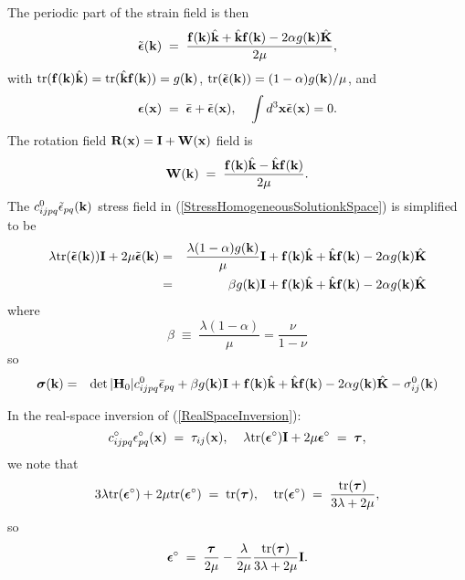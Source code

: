 \documentclass[12pt]{article}
\def\bmath#1{\mbox{\boldmath$#1$}}
\begin{document}
The periodic part of the strain field is then
\begin{equation}
 \tilde{\bmath{\epsilon}}({\bf k}) \;=\; 
\frac{{\bf f}({\bf k})\hat{\bf k}+\hat{\bf k}{\bf f}({\bf k}) - 2\alpha g({\bf k})\hat{\bf K}}
 {2\mu},
\end{equation}
with ${\rm tr}({\bf f}({\bf k})\hat{\bf k})={\rm tr}(\hat{\bf k}{\bf
f}({\bf k}))=g({\bf k})$, ${\rm tr}(\tilde{\bmath{\epsilon}}({\bf k}))=(1-\alpha)g({\bf k})/\mu$, and
\begin{equation}
 \bmath{\epsilon}({\bf x}) \;=\; \bar{\bmath{\epsilon}} + 
 \tilde{\bmath{\epsilon}}({\bf x}), \;\;\;\;
 \int d^3{\bf x} \tilde{\bmath{\epsilon}}({\bf x}) = 0.
\end{equation}
The rotation field ${\bf R}({\bf x})={\bf I}+{\bf W}({\bf x})$ 
 field is
\begin{equation}
 {\bf W}({\bf k}) \;=\; 
\frac{{\bf f}({\bf k})\hat{\bf k}-\hat{\bf k}{\bf f}({\bf k})}
 {2\mu}.
\end{equation}
The $c_{ijpq}^0\tilde{\epsilon}_{pq}({\bf k})$
stress field in (\ref{StressHomogeneousSolutionkSpace}) is simplified to be
\begin{eqnarray}
 \lambda {\rm tr}(\tilde{\bmath{\epsilon}}({\bf k})){\bf I} + 2\mu \tilde{\bmath{\epsilon}}({\bf k})  =&&  
\frac{\lambda(1-\alpha)g({\bf k})}{\mu}{\bf I} + 
 {\bf f}({\bf k})\hat{\bf k}+\hat{\bf k}{\bf f}({\bf k}) - 2\alpha g({\bf k})\hat{\bf K} \nonumber\\
 =&& \beta g({\bf k}){\bf I} + {\bf f}({\bf k})\hat{\bf k}+\hat{\bf k}{\bf f}({\bf k}) - 2\alpha g({\bf k})\hat{\bf K}
\end{eqnarray}
where
\begin{equation}
 \beta \;\equiv\; \frac{\lambda(1-\alpha)}{\mu} = \frac{\nu}{1-\nu}
\end{equation}
so
\begin{eqnarray}
 \bmath{\sigma}({\bf k}) =&& \det|{\bf H}_0|c_{ijpq}^0\bar{\epsilon}_{pq} +
\beta g({\bf k}){\bf I} + {\bf f}({\bf k})\hat{\bf k}+\hat{\bf k}{\bf f}({\bf k}) - 2\alpha g({\bf k})\hat{\bf K}  - \sigma^0_{ij}({\bf k}) \label{StressIsotropicHomogeneousSolutionkSpace}
\end{eqnarray}

In the real-space inversion of (\ref{RealSpaceInversion}):
\begin{equation}
 c^\circ_{ijpq} \epsilon^\circ_{pq}({\bf x}) 
 \;=\; \tau_{ij}({\bf x}), \;\;\;\;
 \lambda{\rm tr}(\bmath{\epsilon}^\circ){\bf I} + 
 2\mu\bmath{\epsilon}^\circ \;=\; \bmath{\tau},
\end{equation}
we note that
\begin{equation}
 3\lambda{\rm tr}(\bmath{\epsilon}^\circ) + 
 2\mu {\rm tr}(\bmath{\epsilon}^\circ)
\;=\; {\rm tr}(\bmath{\tau}), \;\;\;\;
 {\rm tr}(\bmath{\epsilon}^\circ) \;=\; 
 \frac{{\rm tr}(\bmath{\tau})}{3\lambda+2\mu},
\end{equation}
so 
\begin{equation}
  \bmath{\epsilon}^\circ \;=\; \frac{\bmath{\tau}}{2\mu} - 
  \frac{\lambda}{2\mu}
 \frac{{\rm tr}(\bmath{\tau})}{3\lambda+2\mu} {\bf I}.
\end{equation}
\end{document}
